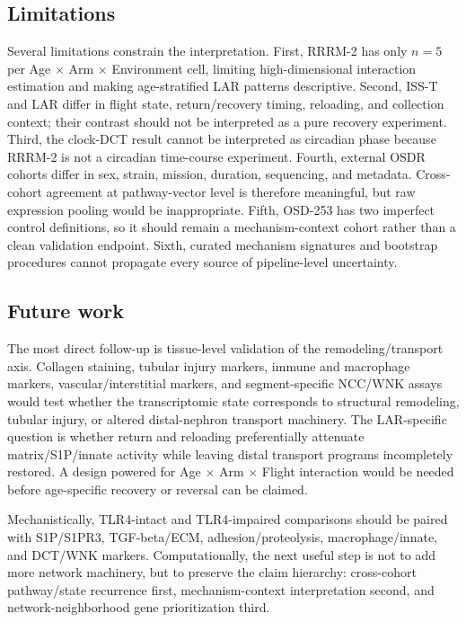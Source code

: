 \documentclass[11pt]{article}
\begin{document}
\subsection{Limitations}

Several limitations constrain the interpretation. First, RRRM-2 has only $n=5$ per Age $\times$ Arm $\times$ Environment cell, limiting high-dimensional interaction estimation and making age-stratified LAR patterns descriptive. Second, ISS-T and LAR differ in flight state, return/recovery timing, reloading, and collection context; their contrast should not be interpreted as a pure recovery experiment. Third, the clock-DCT result cannot be interpreted as circadian phase because RRRM-2 is not a circadian time-course experiment. Fourth, external OSDR cohorts differ in sex, strain, mission, duration, sequencing, and metadata. Cross-cohort agreement at pathway-vector level is therefore meaningful, but raw expression pooling would be inappropriate. Fifth, OSD-253 has two imperfect control definitions, so it should remain a mechanism-context cohort rather than a clean validation endpoint. Sixth, curated mechanism signatures and bootstrap procedures cannot propagate every source of pipeline-level uncertainty.

\subsection{Future work}

The most direct follow-up is tissue-level validation of the remodeling/transport axis. Collagen staining, tubular injury markers, immune and macrophage markers, vascular/interstitial markers, and segment-specific NCC/WNK assays would test whether the transcriptomic state corresponds to structural remodeling, tubular injury, or altered distal-nephron transport machinery. The LAR-specific question is whether return and reloading preferentially attenuate matrix/S1P/innate activity while leaving distal transport programs incompletely restored. A design powered for Age $\times$ Arm $\times$ Flight interaction would be needed before age-specific recovery or reversal can be claimed.

Mechanistically, TLR4-intact and TLR4-impaired comparisons should be paired with S1P/S1PR3, TGF-beta/ECM, adhesion/proteolysis, macrophage/innate, and DCT/WNK markers. Computationally, the next useful step is not to add more network machinery, but to preserve the claim hierarchy: cross-cohort pathway/state recurrence first, mechanism-context interpretation second, and network-neighborhood gene prioritization third.
\end{document}
